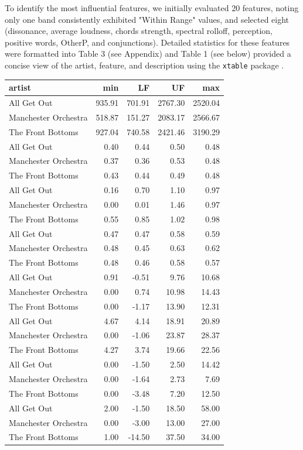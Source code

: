 \documentclass{article}\usepackage[]{graphicx}\usepackage[]{xcolor}
\begin{document}
\begin{multicols}{2}
To identify the most influential features, we initially evaluated 20 features, noting only one band consistently exhibited "Within Range" values, and selected eight (dissonance, average loudness, chords strength, spectral rolloff, perception, positive words, OtherP, and conjunctions). Detailed statistics for these features were formatted into Table 3 (see Appendix) and Table 1 (see below) provided a concise view of the artist, feature, and description using the \texttt{xtable} package \citep{Xtable}.
\begin{table}[ht]
\centering
\begin{tabular}{lrrrr}
  \hline
artist & min & LF & UF & max \\ 
  \hline
All Get Out & 935.91 & 701.91 & 2767.30 & 2520.04 \\ 
  Manchester Orchestra & 518.87 & 151.27 & 2083.17 & 2566.67 \\ 
  The Front Bottoms & 927.04 & 740.58 & 2421.46 & 3190.29 \\ 
  All Get Out & 0.40 & 0.44 & 0.50 & 0.48 \\ 
  Manchester Orchestra & 0.37 & 0.36 & 0.53 & 0.48 \\ 
  The Front Bottoms & 0.43 & 0.44 & 0.49 & 0.48 \\ 
  All Get Out & 0.16 & 0.70 & 1.10 & 0.97 \\ 
  Manchester Orchestra & 0.00 & 0.01 & 1.46 & 0.97 \\ 
  The Front Bottoms & 0.55 & 0.85 & 1.02 & 0.98 \\ 
  All Get Out & 0.47 & 0.47 & 0.58 & 0.59 \\ 
  Manchester Orchestra & 0.48 & 0.45 & 0.63 & 0.62 \\ 
  The Front Bottoms & 0.48 & 0.46 & 0.58 & 0.57 \\ 
  All Get Out & 0.91 & -0.51 & 9.76 & 10.68 \\ 
  Manchester Orchestra & 0.00 & 0.74 & 10.98 & 14.43 \\ 
  The Front Bottoms & 0.00 & -1.17 & 13.90 & 12.31 \\ 
  All Get Out & 4.67 & 4.14 & 18.91 & 20.89 \\ 
  Manchester Orchestra & 0.00 & -1.06 & 23.87 & 28.37 \\ 
  The Front Bottoms & 4.27 & 3.74 & 19.66 & 22.56 \\ 
  All Get Out & 0.00 & -1.50 & 2.50 & 14.42 \\ 
  Manchester Orchestra & 0.00 & -1.64 & 2.73 & 7.69 \\ 
  The Front Bottoms & 0.00 & -3.48 & 7.20 & 12.50 \\ 
  All Get Out & 2.00 & -1.50 & 18.50 & 58.00 \\ 
  Manchester Orchestra & 0.00 & -3.00 & 13.00 & 27.00 \\ 
  The Front Bottoms & 1.00 & -14.50 & 37.50 & 34.00 \\ 
   \hline
\end{tabular}
\end{table}



\end{multicols}
\end{document}
